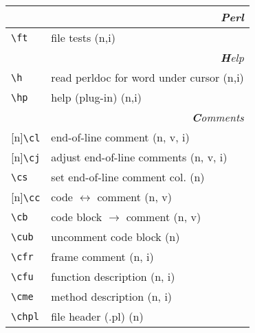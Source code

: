 \documentclass[oneside,10pt,landscape,DIV17]{scrartcl}
\newcommand{\Rep}{{\scriptsize{[n]}}}
\begin{document}
\begin{multicols}{3}
\begin{center}
\begin{tabular}[]{|p{11mm}|p{60mm}|}
\hline 
\multicolumn{2}{|r|}{\textsl{\textbf{P}erl}}\\[1.0ex]
\hline \verb'\ft'    & file tests                      \hfill (n,i)\\
\hline 
\hline 
\multicolumn{2}{|r|}{\textsl{\textbf{H}elp}}\\[1.0ex]
\hline \verb'\h'    & read perldoc for word under cursor \hfill (n,i)\\
\hline \verb'\hp'   & help (plug-in) \hfill (n,i)\\
\hline 
\hline
\multicolumn{2}{|r|}{\textsl{\textbf{C}omments}}                       \\[1.0ex]
\hline \Rep\verb'\cl'   & end-of-line comment               \hfill (n, v, i)\\
\hline \Rep\verb'\cj'   & adjust end-of-line comments       \hfill (n, v, i)\\
\hline     \verb'\cs'   & set end-of-line comment col.      \hfill (n)      \\
%
\hline \Rep\verb'\cc'   & code $\leftrightarrow$ comment    \hfill (n, v)   \\
\hline     \verb'\cb'   & code block $\rightarrow$ comment  \hfill (n, v)   \\
\hline     \verb'\cub'  & uncomment code block              \hfill (n)      \\
%
\hline     \verb'\cfr'  & frame comment                     \hfill (n, i)   \\
\hline     \verb'\cfu'  & function description              \hfill (n, i)   \\
\hline     \verb'\cme'  & method description                \hfill (n, i)   \\
\hline     \verb'\chpl' & file header (.pl)                 \hfill (n)      \\

\end{tabular}
\end{center}
\end{multicols}
\end{document}
